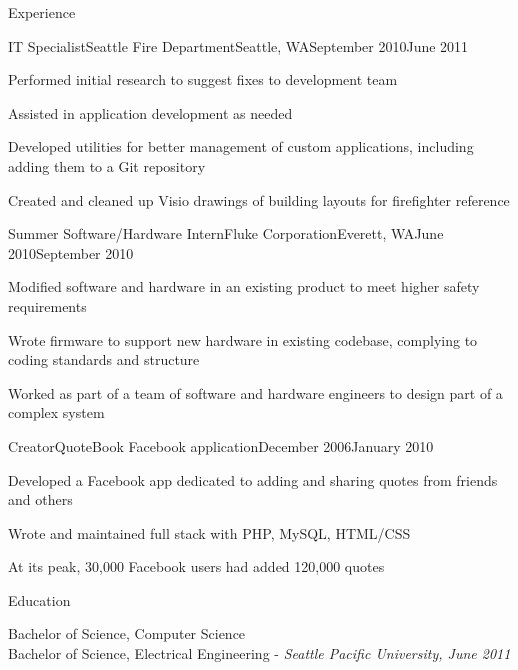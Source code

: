 \documentclass[letterpaper,10pt]{article}
\begin{document}
\begin{res_section}{Experience}
\begin{res_experienceitem}{IT Specialist}{Seattle Fire Department}{Seattle, WA}{September 2010}{June 2011}
  \item Performed initial research to suggest fixes to development team
  \item Assisted in application development as needed
  \item Developed utilities for better management of custom applications, including adding them to a Git repository
  \item Created and cleaned up Visio drawings of building layouts for firefighter reference
\end{res_experienceitem}
\begin{res_experienceitem}{Summer Software/Hardware Intern}{Fluke Corporation}{Everett, WA}{June 2010}{September 2010}
  \item Modified software and hardware in an existing product to meet higher safety requirements
  \item Wrote firmware to support new hardware in existing codebase, complying to coding standards and structure
  \item Worked as part of a team of software and hardware engineers to design part of a complex system
\end{res_experienceitem}
\begin{res_experienceitem}{Creator}{QuoteBook Facebook application}{}{December 2006}{January 2010}
  \item Developed a Facebook app dedicated to adding and sharing quotes from friends and others
  \item Wrote and maintained full stack with PHP, MySQL, HTML/CSS
  \item At its peak, 30,000 Facebook users had added 120,000 quotes
\end{res_experienceitem}
\end{res_section}

\begin{res_section}{Education}
\begin{res_content}{Bachelor of Science, Computer Science\\
Bachelor of Science, Electrical Engineering - \em{Seattle Pacific University, June 2011}
}
\end{res_content}
\end{res_section}
\end{document}
